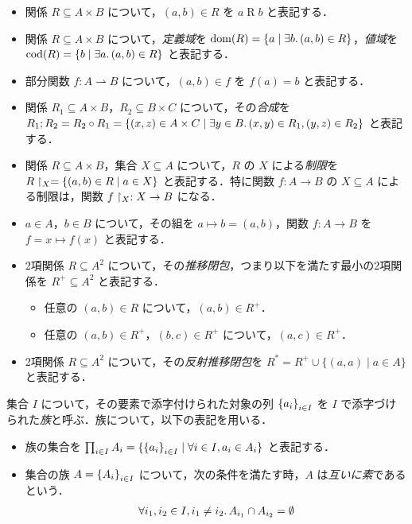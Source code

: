 \begin{itemize}
  \item 関係 $R \subseteq A \times B$ について，$(a, b) \in R$ を $a \mathrel{R} b$ と表記する．
  \item 関係 $R \subseteq A \times B$ について，\emph{定義域}を $\dom(R) = \{a \mid \exists b\ldotp (a, b) \in R\}$，\emph{値域}を $\cod(R) = \{b \mid \exists a\ldotp (a, b) \in R\}$ と表記する．
  \item 部分関数 $f: A \rightharpoonup B$ について，$(a, b) \in f$ を $f(a) = b$ と表記する．
  \item 関係 $R_1 \subseteq A \times B$，$R_2 \subseteq B \times C$ について，その\emph{合成}を $R_1; R_2 = R_2 \circ R_1 = \{(x, z) \in A \times C \mid \exists y \in B\ldotp (x, y) \in R_1, (y, z) \in R_2\}$ と表記する．
  \item 関係 $R \subseteq A \times B$，集合 $X \subseteq A$ について，$R$ の $X$ による\emph{制限}を $R\restrict_X = \{(a, b) \in R \mid a \in X\}$ と表記する．特に関数 $f: A \to B$ の $X \subseteq A$ による制限は，関数 $f\restrict_X: X \to B$ になる．
  \item $a \in A$，$b \in B$ について，その組を $a \mapsto b = (a, b)$，関数 $f: A \to B$ を $f = x \mapsto f(x)$ と表記する．
  \item 2項関係 $R \subseteq A^2$ について，その\emph{推移閉包}，つまり以下を満たす最小の2項関係を $R^+ \subseteq A^2$ と表記する．
  \begin{itemize}
    \item 任意の $(a, b) \in R$ について，$(a, b) \in R^+$．
    \item 任意の $(a, b) \in R^+$，$(b, c) \in R^+$ について，$(a, c) \in R^+$．
  \end{itemize}
  \item 2項関係 $R \subseteq A^2$ について，その\emph{反射推移閉包}を $R^* = R^+ \cup \{(a, a) \mid a \in A\}$ と表記する．
\end{itemize}

集合 $I$ について，その要素で添字付けられた対象の列 $\indexedfamily{i \in I}{a_i}$ を $I$ で添字づけられた\emph{族}と呼ぶ．族について，以下の表記を用いる．
\begin{itemize}
  \item 族の集合を $\indexedfamilyclass{i \in I}{A_i} = \{\indexedfamily{i \in I}{a_i} \mid \forall i \in I, a_i \in A_i\}$ と表記する．
  \item 集合の族 $A = \indexedfamily{i \in I}{A_i}$ について，次の条件を満たす時，$A$ は\emph{互いに素}であるという．
  \begin{align*}
    \forall i_1, i_2 \in I, i_1 \neq i_2\ldotp A_{i_1} \cap A_{i_2} = \emptyset
  \end{align*}
\end{itemize}

